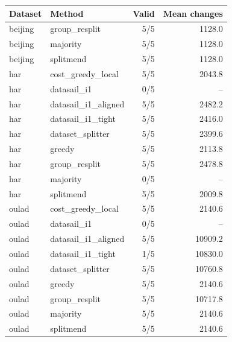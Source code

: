 \begin{tabular}{llrr}
\hline
Dataset & Method & Valid & Mean changes \\
\hline
beijing & group\_resplit & 5/5 & 1128.0 \\
beijing & majority & 5/5 & 1128.0 \\
beijing & splitmend & 5/5 & 1128.0 \\
har & cost\_greedy\_local & 5/5 & 2043.8 \\
har & datasail\_i1 & 0/5 & -- \\
har & datasail\_i1\_aligned & 5/5 & 2482.2 \\
har & datasail\_i1\_tight & 5/5 & 2416.0 \\
har & dataset\_splitter & 5/5 & 2399.6 \\
har & greedy & 5/5 & 2113.8 \\
har & group\_resplit & 5/5 & 2478.8 \\
har & majority & 0/5 & -- \\
har & splitmend & 5/5 & 2009.8 \\
oulad & cost\_greedy\_local & 5/5 & 2140.6 \\
oulad & datasail\_i1 & 0/5 & -- \\
oulad & datasail\_i1\_aligned & 5/5 & 10909.2 \\
oulad & datasail\_i1\_tight & 1/5 & 10830.0 \\
oulad & dataset\_splitter & 5/5 & 10760.8 \\
oulad & greedy & 5/5 & 2140.6 \\
oulad & group\_resplit & 5/5 & 10717.8 \\
oulad & majority & 5/5 & 2140.6 \\
oulad & splitmend & 5/5 & 2140.6 \\
\hline
\end{tabular}
